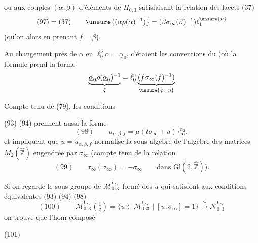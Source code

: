
ou aux couples $(\alpha,\beta)$ d'éléments de $\widehat{\Pi}_{0,3}$
satisfaisant la relation des lacets (37)
\[
 (97)=(37)\qquad
 \unsure{(\alpha\rho(\alpha)^{-1})}
 =(\beta\sigma_\infty(\beta)^{-1})\ell_1^{\unsure{\nu}}
\]
(qu'on  alors en prenant $f=\beta$).


Au changement près de $\alpha$ en $\ell_0^\nu\alpha=\underline{\alpha}_0$,
c'étaient les conventions du  (où la formule prend
 la forme
\[
 \underbrace{\underline{\alpha}_0\rho(\underline{\alpha}_0)^{-1}}_{\xi}
 =\ell_0^\nu
 \underbrace{(f\sigma_\infty(f)^{-1})}_{\unsure{\varphi=\eta}}
\]

Compte tenu de (79), les conditions


(93) (94) prennent aussi la forme
\[
 (98)\qquad u_{\alpha,\beta,f}
 =\mu(t\sigma_\infty+u)\tau_\infty^{\alpha_2},
\]
et impliquent que $\underline{u}=u_{\alpha,\beta,f}$
 normalise la sous-algèbre de l'algèbre des matrices
$M_2(\widehat{\mathbb Z})$ \uline{engendrée} par $\sigma_\infty$
(compte tenu de la relation
\[
 (99)\qquad \tau_\infty(\sigma_\infty)=-\sigma_\infty
 \qquad\text{dans }\mathrm{Gl}(2,\widehat{\mathbb Z})).
\]

Si on regarde le sous-groupe de $\mathcal M_{0,3}^{!\sim}$
formé des $u$ qui satisfont aux conditions équivalentes (93) (94) (98)
\[
 (100)\qquad
 \mathcal M_{0,3}^{!\sim}\left(\tfrac12\right)
 =
 \{u\in\mathcal M_{0,3}^{!\sim}\mid [u,\sigma_\infty]=1\}
 \overset{\sim}{\longrightarrow}\mathcal N_{0,3}^{!\sim}
\]
on trouve que l'hom composé


(101)

